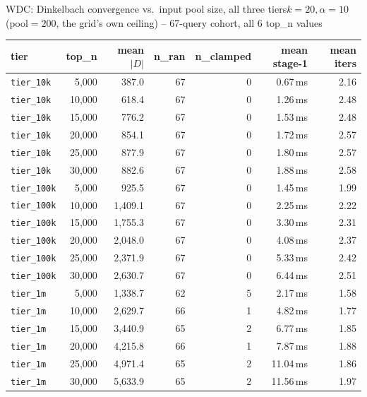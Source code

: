 \documentclass[aspectratio=169,10pt]{beamer}
\begin{document}
\begin{frame}{WDC: Dinkelbach convergence vs.\ input pool size, all three tiers}{$k{=}20,\alpha{=}10$ (pool$=200$, the grid's own ceiling) -- 67-query cohort, all 6 top\_n values}
\tiny
\begin{center}
\begin{tabular}{lrrrrrr}
\toprule
tier & top\_n & mean $|D|$ & n\_ran & n\_clamped & mean stage-1 & mean iters \\
\midrule
\texttt{tier\_10k} & 5{,}000 & 387.0 & 67 & 0 & 0.67\,ms & 2.16 \\
\texttt{tier\_10k} & 10{,}000 & 618.4 & 67 & 0 & 1.26\,ms & 2.48 \\
\texttt{tier\_10k} & 15{,}000 & 776.2 & 67 & 0 & 1.53\,ms & 2.48 \\
\texttt{tier\_10k} & 20{,}000 & 854.1 & 67 & 0 & 1.72\,ms & 2.57 \\
\texttt{tier\_10k} & 25{,}000 & 877.9 & 67 & 0 & 1.80\,ms & 2.57 \\
\texttt{tier\_10k} & 30{,}000 & 882.6 & 67 & 0 & 1.88\,ms & 2.58 \\
\texttt{tier\_100k} & 5{,}000 & 925.5 & 67 & 0 & 1.45\,ms & 1.99 \\
\texttt{tier\_100k} & 10{,}000 & 1{,}409.1 & 67 & 0 & 2.25\,ms & 2.22 \\
\texttt{tier\_100k} & 15{,}000 & 1{,}755.3 & 67 & 0 & 3.30\,ms & 2.31 \\
\texttt{tier\_100k} & 20{,}000 & 2{,}048.0 & 67 & 0 & 4.08\,ms & 2.37 \\
\texttt{tier\_100k} & 25{,}000 & 2{,}371.9 & 67 & 0 & 5.33\,ms & 2.42 \\
\texttt{tier\_100k} & 30{,}000 & 2{,}630.7 & 67 & 0 & 6.44\,ms & 2.51 \\
\texttt{tier\_1m} & 5{,}000 & 1{,}338.7 & 62 & 5 & 2.17\,ms & 1.58 \\
\texttt{tier\_1m} & 10{,}000 & 2{,}629.7 & 66 & 1 & 4.82\,ms & 1.77 \\
\texttt{tier\_1m} & 15{,}000 & 3{,}440.9 & 65 & 2 & 6.77\,ms & 1.85 \\
\texttt{tier\_1m} & 20{,}000 & 4{,}215.8 & 66 & 1 & 7.87\,ms & 1.88 \\
\texttt{tier\_1m} & 25{,}000 & 4{,}971.4 & 65 & 2 & 11.04\,ms & 1.86 \\
\texttt{tier\_1m} & 30{,}000 & 5{,}633.9 & 65 & 2 & 11.56\,ms & 1.97 \\
\bottomrule
\end{tabular}
\end{center}


\end{frame}
\end{document}
